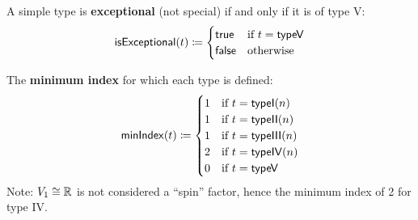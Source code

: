 \begin{definition}[isExceptional]
A simple type is \textbf{exceptional} (not special) if and only if it is of type V:
\[
\mathsf{isExceptional}(t) \coloneqq
\begin{cases}
\mathsf{true} & \text{if } t = \mathsf{typeV} \\
\mathsf{false} & \text{otherwise}
\end{cases}
\]
\end{definition}

\begin{definition}[minIndex]
The \textbf{minimum index} for which each type is defined:
\[
\mathsf{minIndex}(t) \coloneqq
\begin{cases}
1 & \text{if } t = \mathsf{typeI}(n) \\
1 & \text{if } t = \mathsf{typeII}(n) \\
1 & \text{if } t = \mathsf{typeIII}(n) \\
2 & \text{if } t = \mathsf{typeIV}(n) \\
0 & \text{if } t = \mathsf{typeV}
\end{cases}
\]
Note: $V_1 \cong \mathbb{R}$ is not considered a ``spin'' factor, hence the minimum index of 2 for type IV.
\end{definition}
